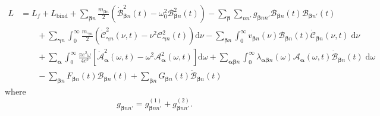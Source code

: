 \documentclass{article}
\begin{document}
\begin{equation}
\begin{split}
L &= 
L_f + L_\mathrm{bind} + \sum_{\bm{\beta}n}\frac{m_{\bm{\beta}n}}{2}\left(\dot{\mathcal{B}}_{\bm{\beta}n}^2(t) - \omega_0^2\mathcal{B}_{\bm{\beta}n}^2(t)\right) - \sum_{\bm{\beta}}\sum_{nn'}g_{\bm{\beta}nn'}\mathcal{B}_{\bm{\beta}n}(t)\mathcal{B}_{\bm{\beta}n'}(t)\\
&\qquad + \sum_{\bm{\gamma}n}\int_0^\infty\frac{m_{\bm{\gamma}n}}{2}\left(\dot{\mathcal{C}}_{\bm{\gamma}n}^2(\nu,t) - \nu^2\mathcal{C}_{\bm{\gamma}n}^2(t)\right)\mathrm{d}\nu - \sum_{\bm{\beta}n}\int_0^\infty v_{\bm{\beta}n}(\nu)\mathcal{B}_{\bm{\beta}n}(t)\dot{\mathcal{C}}_{\bm{\beta}n}(\nu,t)\;\mathrm{d}\nu\\
&\qquad + \sum_{\bm{\alpha}}\int_0^\infty\frac{\pi e^2\omega}{4c^3}\left[\dot{\mathcal{A}}_{\bm{\alpha}}^2(\omega,t) - \omega^2\mathcal{A}_{\bm{\alpha}}^2(\omega,t)\right]\mathrm{d}\omega + \sum_{\bm{\alpha}\bm{\beta}n}\int_0^\infty\lambda_{\bm{\alpha}\bm{\beta}n}(\omega)\mathcal{A}_{\bm{\alpha}}(\omega,t)\dot{\mathcal{B}}_{\bm{\beta}n}(t)\;\mathrm{d}\omega\\
&\qquad - \sum_{\bm{\beta}n}F_{\bm{\beta}n}(t)\mathcal{B}_{\bm{\beta}n}(t) + \sum_{\bm{\beta}n}G_{\bm{\beta}n}(t)\dot{\mathcal{B}}_{\bm{\beta}n}(t)
\end{split}
\end{equation}
where
\begin{equation}
g_{\bm{\beta}nn'} = g_{\bm{\beta}nn'}^{(1)} + g_{\bm{\beta}nn'}^{(2)}.
\end{equation}
\end{document}
